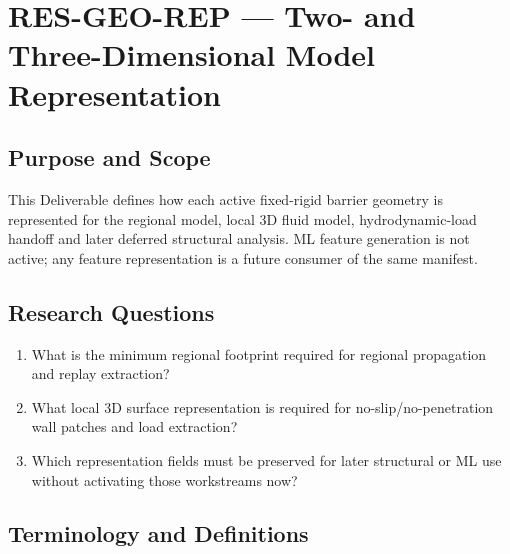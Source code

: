 
\section{RES-GEO-REP --- Two- and Three-Dimensional Model Representation}
\label{sec:res-geo-rep}

\subsection{Purpose and Scope}
\label{sec:res-geo-rep-purpose}

This Deliverable defines how each active fixed-rigid barrier geometry
is represented for the regional model, local 3D fluid model,
hydrodynamic-load handoff and later deferred structural analysis. ML
feature generation is not active; any feature representation is a
future consumer of the same manifest.

\subsection{Research Questions}
\label{sec:res-geo-rep-research-questions}

\begin{enumerate}
  \item What is the minimum regional footprint required for regional
    propagation and replay extraction?
  \item What local 3D surface representation is required for
    no-slip/no-penetration wall patches and load extraction?
  \item Which representation fields must be preserved for later
    structural or ML use without activating those workstreams now?
\end{enumerate}

\subsection{Terminology and Definitions}
\label{sec:res-geo-rep-definitions}

